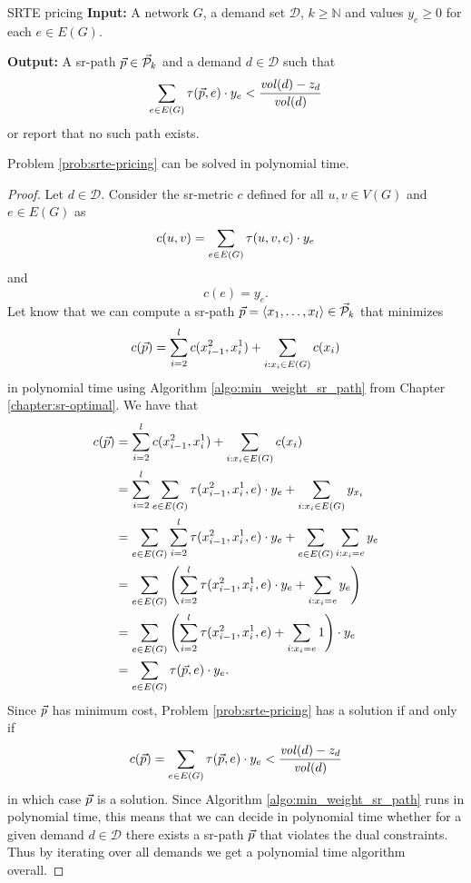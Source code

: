\begin{problem}{SRTE pricing}
\label{prob:srte-pricing}
\textbf{Input:} A network $G$, a demand set $\mathcal{D}$, $k \geq \mathbb{N}$ and values $y_e \geq 0$ for each $e \in E(G)$.

\textbf{Output:} A sr-path $\vec{p} \in \mathcal{\vec{P}}_k$ and a demand $d \in \mathcal{D}$ such that
$$
\sum_{e \in E(G)} \tau(\vec{p}, e) \cdot y_e < \frac{\mathit{vol}(d) - z_d}{\mathit{vol}(d)}
$$
or report that no such path exists.
\end{problem}

\begin{theorem}
Problem \ref{prob:srte-pricing} can be solved in polynomial time. 
\end{theorem}

\begin{proof}
Let $d \in \mathcal{D}$.
Consider the sr-metric $c$ defined for all $u, v \in V(G)$ and $e \in E(G)$ as
$$
c(u, v) = \sum_{e \in E(G)} \tau(u, v, e) \cdot y_e
$$
and
$$
c(e) = y_e.
$$
Let know that we can compute a sr-path $\vec{p} = \langle x_1, \ldots, x_l \rangle \in \mathcal{\vec{P}}_k$ that minimizes
$$
c(\vec{p}) = \sum_{i = 2}^l c(x^2_{i - 1}, x^1_i) + \sum_{i : x_i \in E(G)} c(x_i)
$$
in polynomial time using Algorithm \ref{algo:min_weight_sr_path} from Chapter \ref{chapter:sr-optimal}. We have that
\begin{align*}
c(\vec{p}) & = \sum_{i = 2}^l c(x^2_{i - 1}, x^1_i) + \sum_{i : x_i \in E(G)} c(x_i) \\
& = \sum_{i = 2}^l  \sum_{e \in E(G)} \tau(x^2_{i - 1}, x^1_i, e) \cdot y_e + \sum_{i : x_i \in E(G)} y_{x_i} \\
& = \sum_{e \in E(G)} \sum_{i = 2}^l \tau(x^2_{i - 1}, x^1_i, e) \cdot y_e + \sum_{e \in E(G)} \sum_{i : x_i = e} y_{e} \\
& = \sum_{e \in E(G)} \left( \sum_{i = 2}^l \tau(x^2_{i - 1}, x^1_i, e) \cdot y_e + \sum_{i : x_i = e} y_{e} \right) \\
& = \sum_{e \in E(G)} \left( \sum_{i = 2}^l \tau(x^2_{i - 1}, x^1_i, e) + \sum_{i : x_i = e} 1 \right) \cdot y_e \\
& = \sum_{e \in E(G)} \tau(\vec{p}, e)\cdot y_e.
\end{align*}
Since $\vec{p}$ has minimum cost, Problem \ref{prob:srte-pricing} has a solution if and only if
$$
c(\vec{p}) =  \sum_{e \in E(G)} \tau(\vec{p}, e)\cdot y_e < \frac{\mathit{vol}(d) - z_d}{\mathit{vol}(d)}
$$
in which case $\vec{p}$ is a solution. Since Algorithm \ref{algo:min_weight_sr_path} runs in polynomial time, this means that
we can decide in polynomial time whether for a given demand $d \in \mathcal{D}$ there exists a sr-path $\vec{p}$ that violates the dual constraints.
Thus by iterating over all demands we get a polynomial time algorithm overall.
\end{proof}

